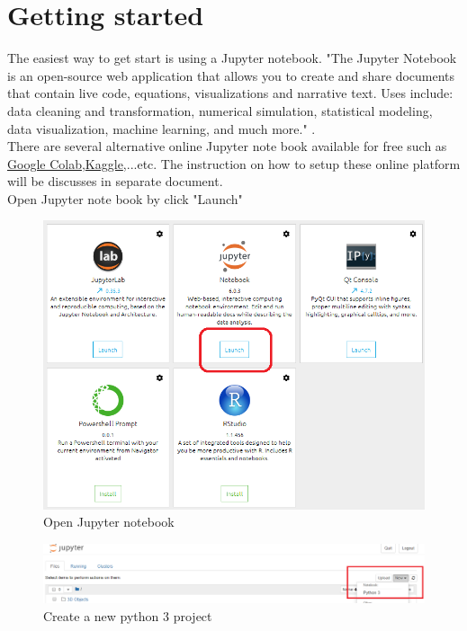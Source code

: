 \documentclass[a4paper,10pt]{article}
\begin{document}
\medskip


\section{Getting started}
\label{sec:start}

The easiest way to get start is using a Jupyter notebook.
"The Jupyter Notebook is an open-source web application that allows you to create and share documents that contain live code, equations, visualizations and narrative text. Uses include: data cleaning and transformation, numerical simulation, statistical modeling, data visualization, machine learning, and much more." \cite{Jupyternotebook}.\\
There are several alternative online Jupyter note book available for free such as \href{https://colab.research.google.com/notebooks/welcome.ipynb}{Google Colab},\href{https://www.kaggle.com/}{Kaggle},...etc. The instruction on how to setup these online platform will be discusses in separate document.\\
Open Jupyter note book by click "Launch"

\begin{figure}[H]
\centering\includegraphics[width=1\columnwidth]{Pictures/Jupyter.png}
\caption[Short title]{Open Jupyter notebook}
\label{fig:ff7}\end{figure}

\begin{figure}[H]
\centering\includegraphics[width=1\columnwidth]{Pictures/Jupyter_new.png}
\caption[Short title]{Create a new python 3 project}
\label{fig:ff8}\end{figure}
\end{document}
